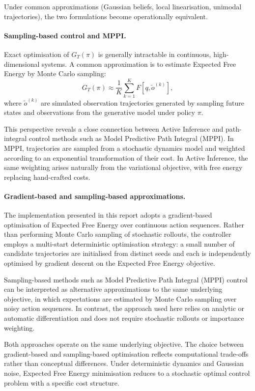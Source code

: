 \documentclass[a4paper, twoside]{article}
\begin{document}
Under common approximations (Gaussian beliefs, local linearisation, unimodal
trajectories), the two formulations become operationally equivalent.

\paragraph{Sampling-based control and MPPI.}
Exact optimisation of $G_T(\pi)$ is generally intractable in continuous,
high-dimensional systems. A common approximation is to estimate Expected Free
Energy by Monte Carlo sampling:
\[
G_T(\pi) \approx \frac{1}{K} \sum_{k=1}^{K}
F\!\left[q, \tilde{o}^{(k)}\right],
\]
where $\tilde{o}^{(k)}$ are simulated observation trajectories generated by
sampling future states and observations from the generative model under policy
$\pi$.

This perspective reveals a close connection between Active Inference and
path-integral control methods such as Model Predictive Path Integral (MPPI).
In MPPI, trajectories are sampled from a stochastic dynamics model and weighted
according to an exponential transformation of their cost. In Active Inference,
the same weighting arises naturally from the variational objective, with free
energy replacing hand-crafted costs.

\paragraph{Gradient-based and sampling-based approximations.}
The implementation presented in this report adopts a gradient-based optimisation
of Expected Free Energy over continuous action sequences. Rather than performing
Monte Carlo sampling of stochastic rollouts, the controller employs a
multi-start deterministic optimisation strategy: a small number of candidate
trajectories are initialised from distinct seeds and each is independently
optimised by gradient descent on the Expected Free Energy objective.

Sampling-based methods such as Model Predictive Path Integral (MPPI) control can
be interpreted as alternative approximations to the same underlying objective,
in which expectations are estimated by Monte Carlo sampling over noisy action
sequences. In contrast, the approach used here relies on analytic or automatic
differentiation and does not require stochastic rollouts or importance
weighting.

Both approaches operate on the same underlying objective. The choice between
gradient-based and sampling-based optimisation reflects computational trade-offs
rather than conceptual differences. 
Under deterministic dynamics and Gaussian noise, Expected Free Energy minimisation reduces to a stochastic optimal control problem with a specific cost structure.
\end{document}
